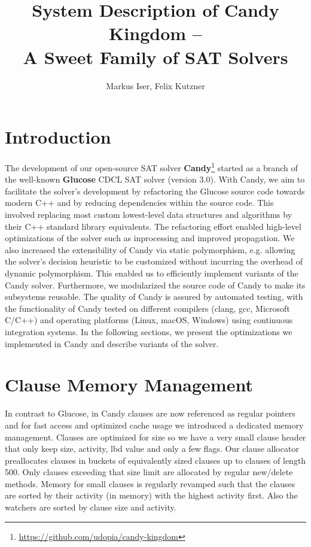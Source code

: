 \documentclass[conference]{IEEEtran}
\title{System Description of Candy Kingdom --\\ A Sweet Family of SAT Solvers}
\author{Markus Iser, Felix Kutzner}
\begin{document}
\maketitle

\begin{abstract}

\end{abstract}

\section{Introduction}

The development of our open-source SAT solver \textbf{Candy}\footnote{\url{https://github.com/udopia/candy-kingdom}} started as a branch of the well-known \textbf{Glucose} \cite{Audemard:2009:Glucose} CDCL SAT solver (version 3.0).
With Candy, we aim to facilitate the solver's development by refactoring the Glucose source code towards modern C++ and by reducing dependencies within the source code.
This involved replacing most custom lowest-level data structures and algorithms by their C++ standard library equivalents.
The refactoring effort enabled high-level optimizations of the solver such as inprocessing and improved propagation.
We also increased the extensibility of Candy via static polymorphism, e.g. allowing the solver's decision heuristic to be customized without incurring the overhead of dynamic polymorphism. This enabled us to efficiently implement variants of the Candy solver.
Furthermore, we modularized the source code of Candy to make its subsystems reusable.
The quality of Candy is assured by automated testing, with the functionality of Candy tested on different compilers (clang, gcc, Microsoft C/C++) and operating platforms (Linux, macOS, Windows) using continuous integration systems.
In the following sections, we present the optimizations we implemented in Candy and describe variants of the solver.

\section{Clause Memory Management}
\label{sec:clauses}

In contrast to Glucose, in Candy clauses are now referenced as regular pointers and for fast access and optimized cache usage we introduced a dedicated memory management. Clauses are optimized for size so we have a very small clause header that only keep size, activity, lbd value and only a few flags. Our clause allocator preallocates clauses in buckets of equivalently sized clauses up to clauses of length 500. Only clauses exceeding that size limit are allocated by regular new/delete methods. Memory for small clauses is regularly revamped such that the clauses are sorted by their activity (in memory) with the highest activity first. Also the watchers are sorted by clause size and activity. 
\end{document}
